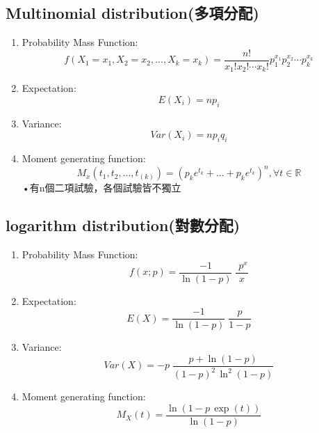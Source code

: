 \documentclass[12pt, a4paper]{article}
\begin{document}
\subsection{Multinomial distribution(多項分配)}
\begin{enumerate}[(a]
\item Probability Mass Function:$$f(X_1 = x_1, X_2 = x_2, ..., X_k = x_k) = \frac{n!}{x_1!x_2!\cdots x_k!}p_1^{x_1} p_2^{x_2} \cdots p_k^{x_k}$$
\item Expectation:$$E(X_{i})=np_{i}$$
\item Variance:$$Var(X_{i})=np_{i}q_{i}$$
\item Moment generating function:$$M_{x}(t_{1},t_{2},...,t_(k))=(p_{k}e^{t_{k}}+...+p_{k}e^{t_{k}})^n,\forall t\in \mathbb{R}$$
•有n個二項試驗，各個試驗皆不獨立
\end{enumerate}
\subsection{logarithm distribution(對數分配)}
\begin{enumerate}[(a]
\item Probability Mass Function:$$f(x;p)={\displaystyle {\frac {-1}{\ln(1-p)}}\;{\frac {\;p^{x}}{x}}\!}$$
\item Expectation:$$E(X)={\displaystyle {\frac {-1}{\ln(1-p)}}\;{\frac {p}{1-p}}\!}$$
\item Variance:$$Var(X)={\displaystyle -p\;{\frac {p+\ln(1-p)}{(1-p)^{2}\,\ln ^{2}(1-p)}}\!}$$
\item Moment generating function:$$M_X(t) ={\displaystyle {\frac {\ln(1-p\,\exp(t))}{\ln(1-p)}}\!}$$
\end{enumerate}
\end{document}
